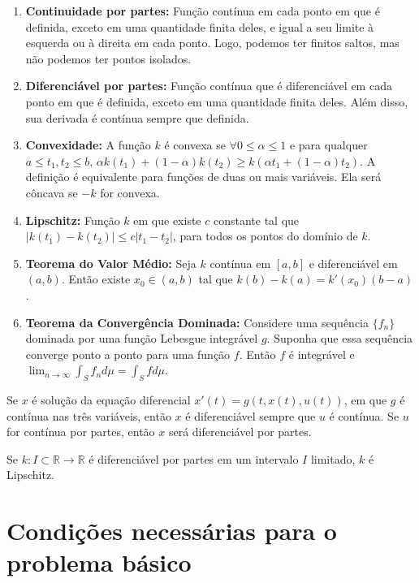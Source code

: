 \begin{enumerate}
    \item \label{piecewise-continuous} \textbf{Continuidade por partes:} Função contínua em cada
    ponto em que é definida, exceto em uma quantidade finita deles, e igual a
    seu limite à esquerda ou à direita em cada ponto. Logo, podemos ter
    finitos saltos, mas não podemos ter pontos isolados. 
    \item \textbf{Diferenciável por partes:} Função contínua que é
    diferenciável em cada ponto em que é definida, exceto em uma quantidade
    finita deles. Além disso, sua derivada é contínua sempre que definida. 
    \item \textbf{Convexidade:} A função $k$ é convexa se $\forall 0 \leq
    \alpha \leq 1$ e para qualquer $a \leq t_1,t_2 \leq b$, $\alpha k(t_1) + (1 -
    \alpha)k(t_2) \geq k(\alpha t_1 + (1 - \alpha)t_2)$. A definição é
    equivalente para funções de duas ou mais variáveis. Ela será côncava se
    $-k$ for convexa. 
    \item \textbf{Lipschitz:} Função $k$ em que existe $c$ constante tal que
    $|k(t_1) - k(t_2)| \leq c|t_1 - t_2|$, para todos os pontos do domínio de
    $k$. 
    \item \textbf{Teorema do Valor Médio:} Seja $k$ contínua em $[a,b]$ e
    diferenciável em $(a,b)$. Então existe $x_0 \in (a,b)$ tal que $k(b) -
    k(a) = k'(x_0)(b - a)$. 
    \item \label{dominated-convergence} \textbf{Teorema da Convergência Dominada:} Considere uma sequência
    $\{f_n\}$ dominada por uma função Lebesgue integrável $g$. Suponha que
    essa sequência converge ponto a ponto para uma função $f$. Então $f$ é
    integrável e $\lim_{n \to \infty} \int_S f_n d\mu = \int_S f d\mu$.
\end{enumerate}

\begin{remark}
    Se $x$ é solução da equação diferencial $x'(t) = g(t, x(t), u(t))$, em que
    $g$ é contínua nas três variáveis, então $x$ é diferenciável sempre que
    $u$ é contínua. Se $u$ for contínua por partes, então $x$ será
    diferenciável por partes. 
\end{remark}

\begin{exercise}
    Se $k: I \subset \mathbb{R} \to \mathbb{R}$ é diferenciável por partes em
    um intervalo $I$ limitado, $k$ é Lipschitz. 
\end{exercise}

\section{Condições necessárias para o problema básico} 

